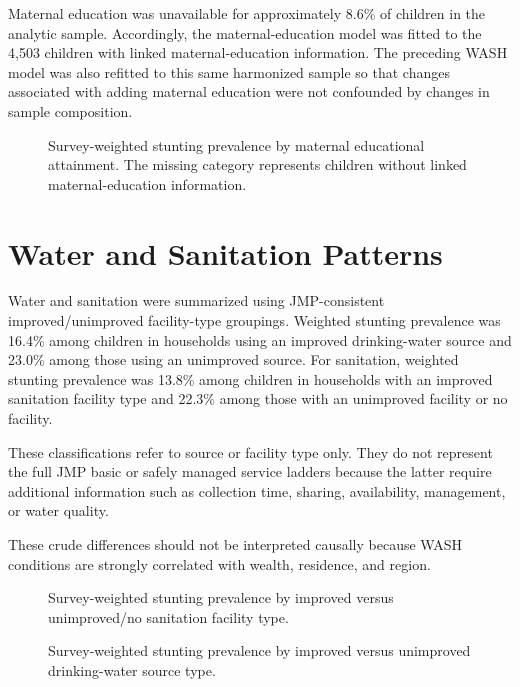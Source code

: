 Maternal education was unavailable for approximately 8.6\% of children in the analytic sample. Accordingly, the maternal-education model was fitted to the 4,503 children with linked maternal-education information. The preceding WASH model was also refitted to this same harmonized sample so that changes associated with adding maternal education were not confounded by changes in sample composition.


\begin{figure}[H]
\centering

\caption{Survey-weighted stunting prevalence by maternal educational attainment. The missing category represents children without linked maternal-education information.}
\label{fig:stunting_matedu}
\end{figure}

\section{Water and Sanitation Patterns}

Water and sanitation were summarized using JMP-consistent improved/unimproved facility-type groupings. Weighted stunting prevalence was 16.4\% among children in households using an improved drinking-water source and 23.0\% among those using an unimproved source. For sanitation, weighted stunting prevalence was 13.8\% among children in households with an improved sanitation facility type and 22.3\% among those with an unimproved facility or no facility.

These classifications refer to source or facility type only. They do not represent the full JMP basic or safely managed service ladders because the latter require additional information such as collection time, sharing, availability, management, or water quality.

These crude differences should not be interpreted causally because WASH conditions are strongly correlated with wealth, residence, and region.

\begin{figure}[H]
\centering

\caption{Survey-weighted stunting prevalence by improved versus unimproved/no sanitation facility type.}
\label{fig:stunting_sanitation}
\end{figure}


\begin{figure}[H]
\centering

\caption[Stunting prevalence by drinking-water source]{Survey-weighted stunting prevalence by improved versus unimproved drinking-water source type.}
\label{fig:stunting_water}
\end{figure}

